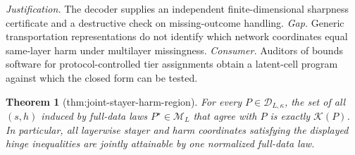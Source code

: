 \documentclass{article}
\newtheorem{theorem}{Theorem}
\begin{document}
\par\smallskip\noindent \textit{Justification.} The decoder supplies an independent finite-dimensional sharpness certificate and a destructive check on missing-outcome handling. \textit{Gap.} Generic transportation representations do not identify which network coordinates equal same-layer harm under multilayer missingness. \textit{Consumer.} Auditors of bounds software for protocol-controlled tier assignments obtain a latent-cell program against which the closed form can be tested.

\begin{theorem}[thm:joint-stayer-harm-region]\label{thm:joint-stayer-harm-region}
For every \(P\in\mathcal D_{L,\kappa}\), the set of all \((s,h)\) induced by full-data laws \(P^{\star}\in\mathcal M_L\) that agree with \(P\) is exactly \(\mathcal K(P)\). In particular, all layerwise stayer and harm coordinates satisfying the displayed hinge inequalities are jointly attainable by one normalized full-data law.
\end{theorem}
\end{document}
